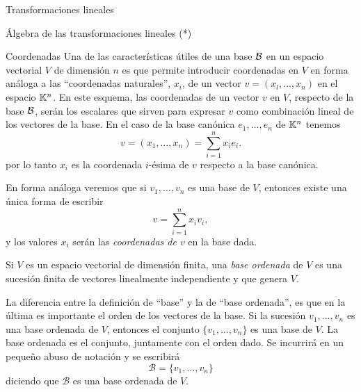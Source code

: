 \begin{chapter}{Transformaciones lineales}
\begin{section}{\'Algebra de las transformaciones lineales (*)}
\begin{enumex}
        \end{enumex}

        \end{section}




        


    \begin{section}{Coordenadas}\label{seccion-coordenadas}
        Una de las características útiles de una base $\mathcal{B}$ en un espacio vectorial  $V$ de dimensión $n$ es que permite introducir coordenadas en $V$ en forma análoga a las ``coordenadas naturales'', $x_i$, de un vector $v = (x_l,\ldots, x_n)$ en el espacio $\mathbb K^n$. En este esquema, las coordenadas de un vector $v$ en $V$, respecto de la base $\mathcal{B}$, serán los escalares que sirven para expresar $v$ como combinación lineal de los vectores de la base. En  el caso  de la base canónica $e_1,\ldots,e_n$ de $\mathbb K^n$ tenemos
        $$
        v = (x_1,\ldots,x_n) = \sum_{i=1}^{n} x_ie_i.
        $$
        por lo tanto $x_i$  es la coordenada $i$-ésima de $v$ respecto a la base canónica. 
        
        En  forma análoga veremos que si $v_1,\ldots,v_n$  es una base de $V$,  entonces existe una única forma de  escribir 
        $$
        v =  \sum_{i=1}^{n} x_iv_i,
        $$ 
        y los valores  $x_i$  serán las \textit{coordenadas de $v$} en la base dada. 
        
        \begin{definicion}
            Si $V$ es un espacio vectorial de dimensión finita, una \textit{base ordenada} de $V$ es una sucesión finita de vectores linealmente independiente y que genera $V$.
        \end{definicion}
        
        
        La diferencia entre la definición de ``base'' y la de ``base ordenada'',  es que en la última es  importante el orden de los vectores de la base. Si la sucesión $v_1,\ldots,v_n$ es una base ordenada de $V$, entonces el conjunto $\{v_1,\ldots,v_n\}$ es una base de $V$. La base ordenada es el conjunto, juntamente con el orden dado. Se incurrirá en un pequeño abuso de notación y se escribirá
        $$
        \mathcal{B} = \{v_1,\ldots,v_n\}
        $$
        diciendo que $\mathcal{B}$ es una base ordenada de $V$.
        

\end{section}
\end{chapter}

